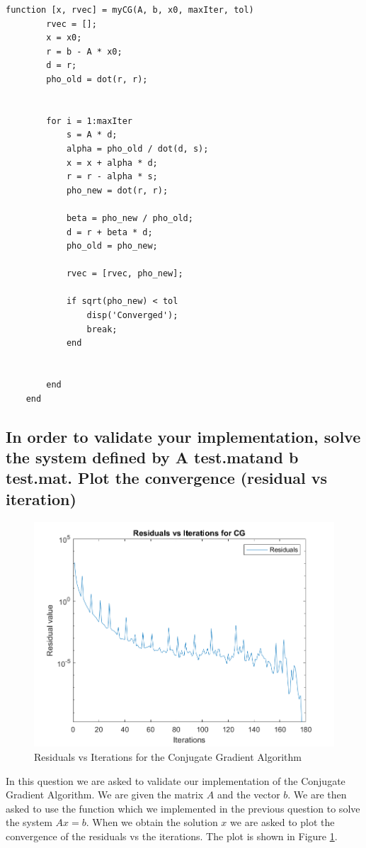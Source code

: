 \documentclass[unicode,11pt,a4paper,oneside,numbers=endperiod,openany]{scrartcl}
\begin{document}
\begin{lstlisting}[style=matlab, caption={Matlab function for Conjugate Gradient}, label={lst:myCG}]
    function [x, rvec] = myCG(A, b, x0, maxIter, tol)
        rvec = [];	
        x = x0;
        r = b - A * x0;
        d = r;
        pho_old = dot(r, r);
        
        
        for i = 1:maxIter
            s = A * d;
            alpha = pho_old / dot(d, s);
            x = x + alpha * d;
            r = r - alpha * s;
            pho_new = dot(r, r);

            beta = pho_new / pho_old;
            d = r + beta * d;
            pho_old = pho_new;
            
            rvec = [rvec, pho_new];

            if sqrt(pho_new) < tol
                disp('Converged');
                break;
            end
            
            
        end
    end
\end{lstlisting}

\subsection{In order to validate your implementation, solve the system deﬁned by A test.matand b test.mat. Plot the convergence (residual vs iteration)}

\begin{figure}[H]
    \centering
    \includegraphics[width=0.8\linewidth]{graphs/residuals.png}
    \caption{Residuals vs Iterations for the Conjugate Gradient Algorithm}
    \label{fig:residuals}
\end{figure}

In this question we are asked to validate our implementation of the Conjugate Gradient Algorithm. We are given the matrix $A$ and the vector $b$. We are then asked to use the function which we implemented in the previous question to solve the system $Ax = b$. When we obtain the solution $x$ we are asked to plot the convergence of the residuals vs the iterations. The plot is shown in Figure \ref{fig:residuals}.
\end{document}
